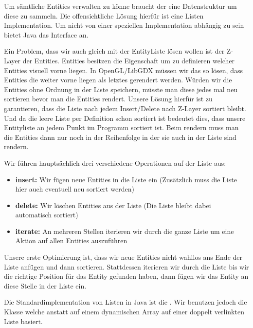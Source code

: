 Um sämtliche Entities verwalten zu könne braucht der  eine Datenstruktur um diese zu sammeln. Die offensichtliche Lösung hierfür ist eine Listen Implementation. Um nicht von einer speziellen Implementation abhängig zu sein bietet Java das  Interface an.

Ein Problem, dass wir auch gleich mit der EntityListe lösen wollen ist der Z-Layer der Entities. Entities besitzen die  Eigenschaft um zu definieren welcher Entities visuell vorne liegen. In OpenGL/LibGDX müssen wir das so lösen, dass Entities die weiter vorne liegen als letztes gerendert werden. Würden wir die Entities ohne Ordnung in der Liste speichern, müsste man diese jedes mal neu sortieren bevor man die Entities rendert. 
Unsere Lösung hierfür ist zu garantieren, dass die Liste nach jedem Insert/Delete nach Z-Layer sortiert bleibt. Und da die leere Liste per Definition schon sortiert ist bedeutet dies, dass unsere Entityliste an jedem Punkt im Programm  sortiert ist. Beim rendern muss man die Entities dann nur noch in der Reihenfolge in der sie auch in der Liste sind rendern.

Wir führen hauptsächlich drei verschiedene Operationen auf der Liste aus:

\begin{itemize}
\item\textbf{insert:} Wir fügen neue Entities in die Liste ein (Zusätzlich muss die Liste hier auch eventuell neu sortiert werden)
\item\textbf{delete:} Wir löschen Entities aus der Liste (Die Liste bleibt dabei automatisch sortiert)
\item\textbf{iterate:} An mehreren Stellen iterieren wir durch die ganze Liste um eine Aktion auf allen Entities auszuführen
\end{itemize}

Unsere erste Optimierung ist, dass wir neue Entities nicht wahllos ans Ende der Liste anfügen und dann sortieren. Stattdessen iterieren wir durch die Liste bis wir die richtige Position für das Entity gefunden haben, dann fügen wir das Entity an diese Stelle in der Liste ein.

Die Standardimplementation von Listen in Java ist die . Wir benutzen jedoch die Klasse  welche anstatt auf einem dynamischen Array auf einer doppelt verlinkten Liste basiert.

